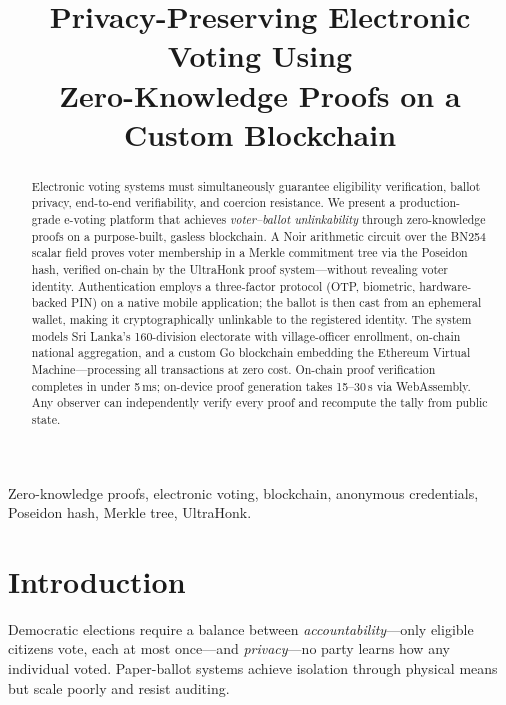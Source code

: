\documentclass[conference]{IEEEtran}
\theoremstyle{definition}
\theoremstyle{plain}
\begin{document}
\title{Privacy-Preserving Electronic Voting Using\\Zero-Knowledge Proofs on a Custom Blockchain}

\author{}

\maketitle

\begin{abstract}
Electronic voting systems must simultaneously guarantee eligibility verification, ballot privacy, end-to-end verifiability, and coercion resistance. We present a production-grade e-voting platform that achieves \emph{voter--ballot unlinkability} through zero-knowledge proofs on a purpose-built, gasless blockchain. A Noir arithmetic circuit over the BN254 scalar field proves voter membership in a Merkle commitment tree via the Poseidon hash, verified on-chain by the UltraHonk proof system---without revealing voter identity. Authentication employs a three-factor protocol (OTP, biometric, hardware-backed PIN) on a native mobile application; the ballot is then cast from an ephemeral wallet, making it cryptographically unlinkable to the registered identity. The system models Sri Lanka's 160-division electorate with village-officer enrollment, on-chain national aggregation, and a custom Go blockchain embedding the Ethereum Virtual Machine---processing all transactions at zero cost. On-chain proof verification completes in under 5\,ms; on-device proof generation takes 15--30\,s via WebAssembly. Any observer can independently verify every proof and recompute the tally from public state.
\end{abstract}

\begin{IEEEkeywords}
Zero-knowledge proofs, electronic voting, blockchain, anonymous credentials, Poseidon hash, Merkle tree, UltraHonk.
\end{IEEEkeywords}

\section{Introduction}

Democratic elections require a balance between \emph{accountability}---only eligible citizens vote, each at most once---and \emph{privacy}---no party learns how any individual voted. Paper-ballot systems achieve isolation through physical means but scale poorly and resist auditing.
\end{document}
